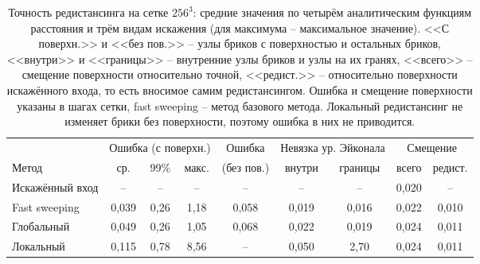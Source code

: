 \begin{table}[ht]
    \centering
    \small
    \setlength{\tabcolsep}{4pt}
    \caption{Точность редистансинга на сетке $256^3$: средние значения по четырём аналитическим функциям расстояния и трём видам искажения (для максимума -- максимальное значение). <<С поверхн.>> и <<без пов.>> -- узлы бриков с поверхностью и остальных бриков, <<внутри>> и <<границы>> -- внутренние узлы бриков и узлы на их гранях, <<всего>> -- смещение поверхности относительно точной, <<редист.>> -- относительно поверхности искажённого входа, то есть вносимое самим редистансингом. Ошибка и смещение поверхности указаны в шагах сетки, fast sweeping -- метод базового метода. Локальный редистансинг не изменяет брики без поверхности, поэтому ошибка в них не приводится.}
    \label{tab:redist}
    \begin{tabular}{lcccccccc}
        \toprule
        & \multicolumn{3}{c}{Ошибка (с поверхн.)} & Ошибка & \multicolumn{2}{c}{Невязка ур. Эйконала} & \multicolumn{2}{c}{Смещение} \\
        \cmidrule(lr){2-4} \cmidrule(lr){6-7} \cmidrule(lr){8-9}
        Метод & ср. & 99\% & макс. & (без пов.) & внутри & границы & всего & редист. \\
        \midrule
        Искажённый вход & -- & -- & -- & -- & -- & -- & 0,020 & -- \\
        Fast sweeping & 0,039 & 0,26 & 1,18 & 0,058 & 0,019 & 0,016 & 0,022 & 0,010 \\
        Глобальный & 0,049 & 0,26 & 1,05 & 0,068 & 0,022 & 0,019 & 0,024 & 0,011 \\
        Локальный & 0,115 & 0,78 & 8,56 & -- & 0,050 & 2,70 & 0,024 & 0,011 \\
        \bottomrule
    \end{tabular}
\end{table}


